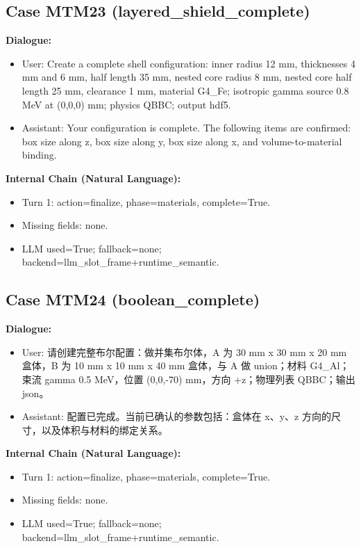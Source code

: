 \documentclass[11pt]{ctexart}
\begin{document}
\subsection{Case MTM23 (layered\_shield\_complete)}
\textbf{Dialogue:}
\begin{itemize}
\item User: Create a complete shell configuration: inner radius 12 mm, thicknesses 4 mm and 6 mm, half length 35 mm, nested core radius 8 mm, nested core half length 25 mm, clearance 1 mm, material G4\_Fe; isotropic gamma source 0.8 MeV at (0,0,0) mm; physics QBBC; output hdf5.
\item Assistant: Your configuration is complete. The following items are confirmed: box size along z, box size along y, box size along x, and volume-to-material binding.
\end{itemize}
\textbf{Internal Chain (Natural Language):}
\begin{itemize}
\item Turn 1: action=finalize, phase=materials, complete=True.
\item Missing fields: none.
\item LLM used=True; fallback=none; backend=llm\_slot\_frame+runtime\_semantic.
\end{itemize}
\subsection{Case MTM24 (boolean\_complete)}
\textbf{Dialogue:}
\begin{itemize}
\item User: 请创建完整布尔配置：做并集布尔体，A 为 30 mm x 30 mm x 20 mm 盒体，B 为 10 mm x 10 mm x 40 mm 盒体，与 A 做 union；材料 G4\_Al；束流 gamma 0.5 MeV，位置 (0,0,-70) mm，方向 +z；物理列表 QBBC；输出 json。
\item Assistant: 配置已完成。当前已确认的参数包括：盒体在 x、y、z 方向的尺寸，以及体积与材料的绑定关系。
\end{itemize}
\textbf{Internal Chain (Natural Language):}
\begin{itemize}
\item Turn 1: action=finalize, phase=materials, complete=True.
\item Missing fields: none.
\item LLM used=True; fallback=none; backend=llm\_slot\_frame+runtime\_semantic.
\end{itemize}
\end{document}
